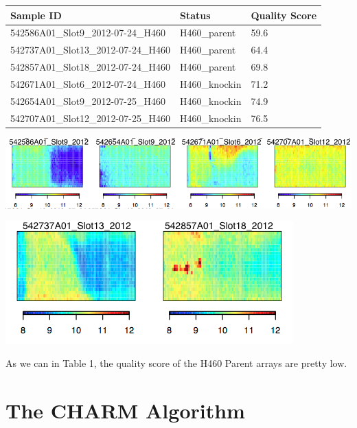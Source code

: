 \documentclass[11pt]{article}
\begin{document}
\begin{table}[H]
    \begin{tabular}{|l|l|l|}
    \hline
    Sample ID                        & Status       & Quality Score     \\ \hline
    542586A01\_Slot9\_2012-07-24\_H460 & H460\_parent & 59.6  \\ \hline
    542737A01\_Slot13\_2012-07-24\_H460 & H460\_parent & 64.4  \\ \hline
    542857A01\_Slot18\_2012-07-24\_H460 & H460\_parent & 69.8  \\ \hline
	542671A01\_Slot6\_2012-07-24\_H460 & H460\_knockin & 71.2  \\ \hline
    542654A01\_Slot9\_2012-07-25\_H460 & H460\_knockin & 74.9  \\ \hline    
    542707A01\_Slot12\_2012-07-25\_H460 & H460\_knockin & 76.5   \\ \hline
    \end{tabular}

\end{table}

\includegraphics[scale=0.5]{qcImage1.png}

\includegraphics[scale=0.5]{qcImage2.png}


As we can in Table 1, the quality score of the H460 Parent arrays are pretty low.

\section*{The CHARM Algorithm}

%
%
\end{document}
